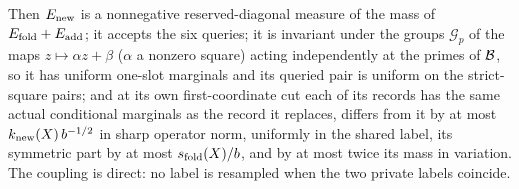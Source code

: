\begin{lemma}
\begin{enumerate}[label=(\alph*)]
 Then $E_{\rm new}$ is a nonnegative reserved-diagonal measure of the mass of
 $E_{\rm fold}+E_{\rm add}$; it accepts the six queries; it is invariant under
 the groups $\mathcal G_p$ of the maps $z\mapsto\alpha z+\beta$ ($\alpha$ a
 nonzero square) acting independently at the primes of $\mathcal B$, so it has
 uniform one-slot marginals and its queried pair is uniform on the
 strict-square pairs; and at its own first-coordinate cut each of its
 records has the same actual conditional marginals as the record it
 replaces, differs from it by at most $k_{\rm new}(X)\,b^{-1/2}$ in sharp
 operator norm, uniformly in the shared label, its symmetric part by at
 most $s_{\rm fold}(X)/b$, and by at most twice its mass in variation. The coupling is direct: no label is resampled when the two private labels coincide.
\end{enumerate}
\end{lemma}

